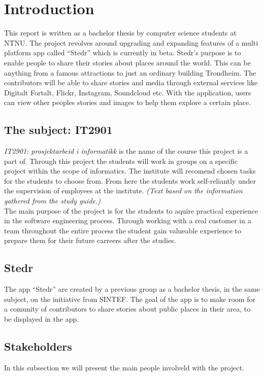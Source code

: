 \section{Introduction}
	\setcounter{page}{1}


This report is written as a bachelor thesis by computer science students at NTNU. The project revolves around upgrading and expanding features of a multi platform app called “Stedr” which is currently in beta. Stedr's purpose is to enable people to share their stories about places around the world. This can be anything from a famous attractions to just an ordinary building Trondheim. The contributors will be able to share stories and media through external services like Digitalt Fortalt, Flickr, Instagram, Soundcloud etc. With the application, users can view other peoples stories and images  to help them explore a certain place.

\subsection{The subject: IT2901}
\emph{IT2901: prosjektarbeid i informatikk} is the name of the course this project is a part of. Through this project the students will work in groups on a specific project within the scope of informatics. The institute will recomend chosen tasks for the students to choose from. From here the students work self-reliantly under the supervision of employees at the institute. \textit{(Text based on the information gathered from the study guide.)}\\ The main purpose of the project is for the students to aquire practical experience in the software engineering process. Through working with a real customer in a team throughout the entire process the student gain valueable experience to prepare them for their future carreers after the studies.

\subsection{Stedr}
The app “Stedr” are created by a previous group as a bachelor thesis, in the same subject, on the initiative from SINTEF. The goal of the app is to make room for a comunity of contributors to share stories about public places in their area, to be displayed in the app. 

\subsection{Stakeholders}
In this subsection we will present the main people involveld with the project. 

